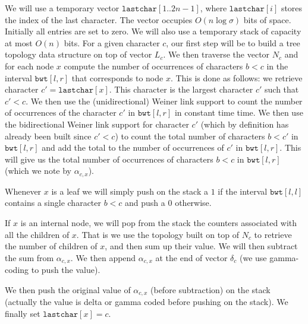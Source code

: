 \documentclass[a4paper]{article}
\begin{document}
We will use a temporary vector $\mathtt{lastchar}[1..2n-1]$, 
where $\mathtt{lastchar}[i]$ stores the index of the last character. 
The vector occupies $O(n\log\sigma)$ bits of space. 
Initially all entries are set to zero. 
We will also use a temporary stack of capacity at most $O(n)$ bits. 
For a given character $c$, our first step will be to build a tree topology 
data structure on top of vector $L_c$. 
We then traverse the vector $N_c$ and 
for each node $x$ compute the number of occurrences of characters $b<c$ 
in the interval $\mathtt{bwt}[l,r]$ that corresponds to node $x$. This is done as follows:
we retrieve character $c'=\mathtt{lastchar}[x]$. This character 
is the largest character $c'$ such that $c'<c$. We then 
use the (unidirectional) Weiner link support to count the number of occurrences of the 
character $c'$ in $\mathtt{bwt}[l,r]$ in constant time time. 
We then use the bidirectional Weiner link support for character $c'$ (which by definition 
has already been built since $c'<c$) to count the total number 
of characters $b<c'$ in $\mathtt{bwt}[l,r]$ and add the total to the number of occurrences of 
$c'$ in $\mathtt{bwt}[l,r]$. This will give us the total number of occurrences of characters 
$b<c$ in $\mathtt{bwt}[l,r]$ (which we note by $\alpha_{c,x}$).

Whenever $x$ is a leaf we will simply push on the stack 
a $1$ if the interval $\mathtt{bwt}[l,l]$ contains a single 
character $b<c$ and push a $0$ otherwise. 

If $x$ is an internal node, we will pop from the stack the counters 
associated with all the children of $x$. That is we use the topology
built on top of $N_c$ to retrieve the number of children of $x$, 
and then sum up their value. We will then subtract the sum from 
$\alpha_{c,x}$. We then append $\alpha_{c,x}$ at the end of vector 
$\delta_c$ (we use gamma-coding to push the value).

We then push the original value of $\alpha_{c,x}$ (before subtraction) 
on the stack (actually the value is delta or gamma coded before 
pushing on the stack). We finally set $\mathtt{lastchar}[x]=c$. 
\end{document}
